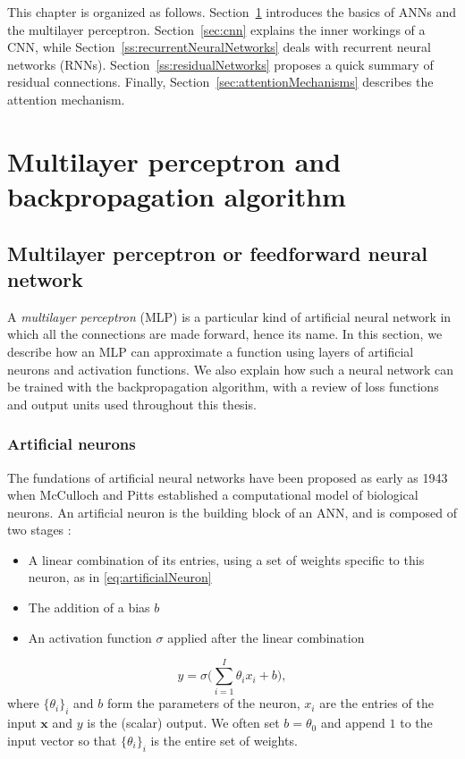 This chapter is organized as follows. Section~\ref{sec:mlp} introduces the basics of ANNs and the multilayer perceptron. Section~\ref{sec:cnn} explains the inner workings of a CNN, while Section~\ref{ss:recurrentNeuralNetworks} deals with recurrent neural networks (RNNs). Section~\ref{ss:residualNetworks} proposes a quick summary of residual connections. Finally, Section~\ref{sec:attentionMechanisms} describes the attention mechanism.

\section{Multilayer perceptron and backpropagation algorithm}
\label{sec:mlp}

\subsection{Multilayer perceptron or feedforward neural network}

A \textit{multilayer perceptron} (MLP) is a particular kind of artificial neural network in which all the connections are made forward, hence its name. In this section, we describe how an MLP can approximate a function using layers of artificial neurons and activation functions. We also explain how such a neural network can be trained with the backpropagation algorithm, with a review of loss functions and output units used throughout this thesis.

\subsubsection{Artificial neurons}

The fundations of artificial neural networks have been proposed as early as 1943 when McCulloch and Pitts \cite{mcculloch_logicial_1943} established a computational model of biological neurons. An artificial neuron is the building block of an ANN, and is composed of two stages :
\begin{itemize}
    \item A linear combination of its entries, using a set of weights specific to this neuron, as in \eqref{eq:artificialNeuron}
    \item The addition of a bias $b$
    \item An activation function $\sigma$ applied after the linear combination
\end{itemize}
\begin{equation}
\label{eq:artificialNeuron}
    y = \sigma \Big( \sum_{i=1}^{I} \theta_i x_i + b \Big),
\end{equation}
where $\{\theta_i\}_i$ and $b$ form the parameters of the neuron, $x_i$ are the entries of the input $\mathbf{x}$ and $y$ is the (scalar) output. We often set $b=\theta_0$ and append $1$ to the input vector so that $\{\theta_i\}_i$ is the entire set of weights.

